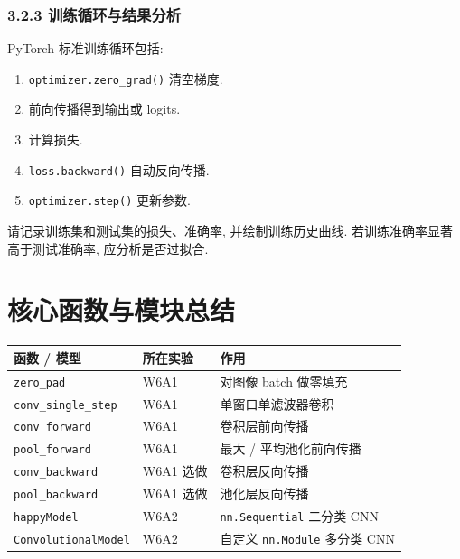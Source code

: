 \documentclass{../../nndlcourse}
\begin{document}
\subsubsection*{3.2.3 训练循环与结果分析}

PyTorch 标准训练循环包括:
\begin{enumerate}
    \item \texttt{optimizer.zero\_grad()} 清空梯度.
    \item 前向传播得到输出或 logits.
    \item 计算损失.
    \item \texttt{loss.backward()} 自动反向传播.
    \item \texttt{optimizer.step()} 更新参数.
\end{enumerate}
请记录训练集和测试集的损失、准确率, 并绘制训练历史曲线. 若训练准确率显著高于测试准确率, 应分析是否过拟合.


\section{核心函数与模块总结}

\begin{center}
\begin{tabular}{|l|l|l|}
\hline
\textbf{函数 / 模型} & \textbf{所在实验} & \textbf{作用} \\
\hline
\texttt{zero\_pad} & W6A1 & 对图像 batch 做零填充 \\
\texttt{conv\_single\_step} & W6A1 & 单窗口单滤波器卷积 \\
\texttt{conv\_forward} & W6A1 & 卷积层前向传播 \\
\texttt{pool\_forward} & W6A1 & 最大 / 平均池化前向传播 \\
\texttt{conv\_backward} & W6A1 选做 & 卷积层反向传播 \\
\texttt{pool\_backward} & W6A1 选做 & 池化层反向传播 \\
\texttt{happyModel} & W6A2 & \texttt{nn.Sequential} 二分类 CNN \\
\texttt{ConvolutionalModel} & W6A2 & 自定义 \texttt{nn.Module} 多分类 CNN \\
\hline
\end{tabular}
\end{center}


\end{document}
